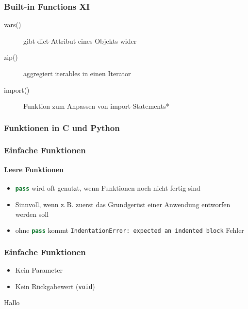 \documentclass[ngerman]{beamer}
\newcommand{\ta}[1]{\textattachfile[color=1 0 0]{#1}{Code}}
\begin{document}
\begin{frame}
\frametitle{Built-in Functions XI}

\begin{description}
\item[vars()] gibt dict-Attribut eines Objekts wider
\item[zip()] aggregiert iterables in einen Iterator
\item[\textunderscore \textunderscore import()\textunderscore \textunderscore] Funktion zum Anpassen von import-Statements*
\end{description}



\end{frame}


\begin{frame}[containsverbatim]
\frametitle{Funktionen in C und Python}

\vspace*{-0.5em}




\end{frame}

\begin{frame}[containsverbatim]
\frametitle{Einfache Funktionen}
\framesubtitle{Leere Funktionen}

\begin{itemize}
\item \lstinline[language={Python}]{pass} wird oft genutzt, wenn Funktionen noch nicht fertig sind
\item Sinnvoll, wenn z.\,B. zuerst das Grundgerüst einer Anwendung entworfen werden soll
\item ohne \lstinline[language={Python}]{pass} kommt \texttt{IndentationError: expected an indented block} Fehler
\end{itemize}

%

\end{frame}


\begin{frame}[containsverbatim]
\frametitle{Einfache Funktionen}

\begin{itemize}
	\item Kein Parameter
	\item Kein Rückgabewert (\texttt{void})
\end{itemize}

%

\begin{ausgabe}
Hallo
\end{ausgabe}

\end{frame}
\end{document}
